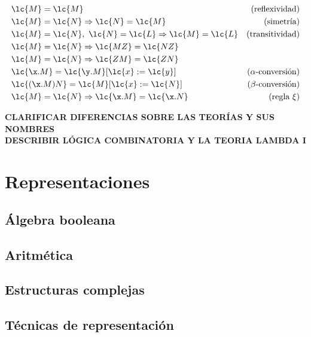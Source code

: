\begin{align} 
  &\lc{M} = \lc{M} &(\text{reflexividad})\\
  &\lc{M} = \lc{N} \Rightarrow \lc{N} = \lc{M} &(\text{simetría})\\ 
  &\lc{M} = \lc{N},\ \lc{N} = \lc{L} \Rightarrow \lc{M} = \lc{L} &(\text{transitividad})\\ 
  &\lc{M} = \lc{N} \Rightarrow \lc{M Z} = \lc{N Z}\\
  &\lc{M} = \lc{N} \Rightarrow \lc{Z M} = \lc{Z N}\\
  &\lc{\x.M} = \lc{\y.M}[\lc{x}:=\lc{y}] &(\alpha\text{-conversión})\\ 
  &\lc{(\x.M)N} = \lc{M}[\lc{x}:=\lc{N}] &(\beta\text{-conversión})\\
  &\lc{M} = \lc{N} \Rightarrow \lc{\x.M} = \lc{\x.N} &(\text{regla } \xi)
\end{align}

\textbf{CLARIFICAR DIFERENCIAS SOBRE LAS TEORÍAS Y SUS NOMBRES}\\

\textbf{DESCRIBIR LÓGICA COMBINATORIA Y LA TEORIA LAMBDA I}

\section{Representaciones} \label{sec:1.3}

\subsection{Álgebra booleana} \label{sec:1.3.1}

\subsection{Aritmética} \label{sec:1.3.2}

\subsection{Estructuras complejas} \label{sec:1.3.3}

\subsection{Técnicas de representación} \label{sec:1.3.4}

